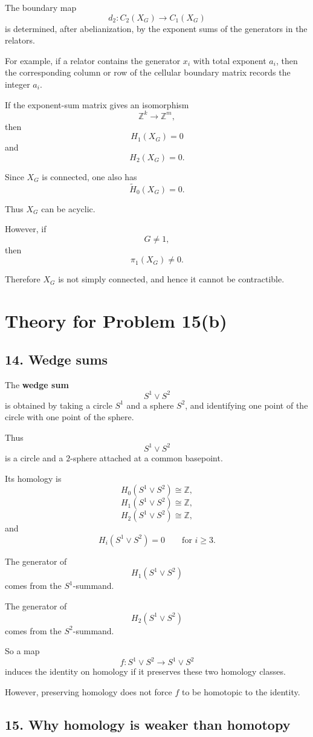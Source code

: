 \documentclass[12pt,a4paper]{article}
\theoremstyle{notespace}
\begin{document}
The boundary map
\[
d_2:C_2(X_G)\to C_1(X_G)
\]
is determined, after abelianization, by the exponent sums of the generators in the relators.

For example, if a relator contains the generator \(x_i\) with total exponent \(a_i\), then the corresponding column or row of the cellular boundary matrix records the integer \(a_i\).

If the exponent-sum matrix gives an isomorphism
\[
\mathbb Z^k\to \mathbb Z^m,
\]
then
\[
H_1(X_G)=0
\]
and
\[
H_2(X_G)=0.
\]

Since \(X_G\) is connected, one also has
\[
\widetilde H_0(X_G)=0.
\]

Thus \(X_G\) can be acyclic.

However, if
\[
G\neq 1,
\]
then
\[
\pi_1(X_G)\neq 0.
\]

Therefore \(X_G\) is not simply connected, and hence it cannot be contractible.

\section*{Theory for Problem 15(b)}

\subsection*{14. Wedge sums}

The \textbf{wedge sum}
\[
S^1\vee S^2
\]
is obtained by taking a circle \(S^1\) and a sphere \(S^2\), and identifying one point of the circle with one point of the sphere.

Thus
\[
S^1\vee S^2
\]
is a circle and a \(2\)-sphere attached at a common basepoint.

Its homology is
\[
H_0(S^1\vee S^2)\cong \mathbb Z,
\]
\[
H_1(S^1\vee S^2)\cong \mathbb Z,
\]
\[
H_2(S^1\vee S^2)\cong \mathbb Z,
\]
and
\[
H_i(S^1\vee S^2)=0
\qquad
\text{for }i\geq 3.
\]

The generator of
\[
H_1(S^1\vee S^2)
\]
comes from the \(S^1\)-summand.

The generator of
\[
H_2(S^1\vee S^2)
\]
comes from the \(S^2\)-summand.

So a map
\[
f:S^1\vee S^2\to S^1\vee S^2
\]
induces the identity on homology if it preserves these two homology classes.

However, preserving homology does not force \(f\) to be homotopic to the identity.

\subsection*{15. Why homology is weaker than homotopy}
\end{document}
